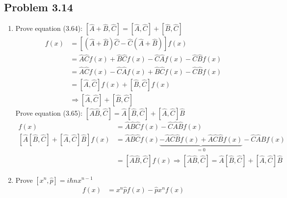 \documentclass{article}
\begin{document}
\subsection*{Problem 3.14}
\begin{enumerate}[label=(\alph*)]
	\item Prove equation (3.64): \([\hat{A} + \hat{B}, \hat{C}] = [\hat{A}, \hat{C}] + [\hat{B}, \hat{C}]\)
	      \begin{align*}
		      [\hat{A} + \hat{B}, \hat{C}] f(x) & = [(\hat{A} + \hat{B}) \hat{C} - \hat{C} (\hat{A} + \hat{B})] f(x)                          \\
		                                        & = \hat{A} \hat{C} f(x) + \hat{B} \hat{C} f(x) - \hat{C} \hat{A} f(x) - \hat{C} \hat{B} f(x) \\
		                                        & = \hat{A} \hat{C} f(x) - \hat{C} \hat{A} f(x) + \hat{B} \hat{C} f(x) - \hat{C} \hat{B} f(x) \\
		                                        & = [\hat{A}, \hat{C}] f(x) + [\hat{B}, \hat{C}] f(x)                                         \\
		                                        & \Rightarrow [\hat{A}, \hat{C}] + [\hat{B}, \hat{C}]
	      \end{align*}
	      Prove equation (3.65): \( [\hat{A} \hat{B}, \hat{C}] = \hat{A} [\hat{B}, \hat{C}] + [\hat{A}, \hat{C}] \hat{B} \)
	      \begin{align*}
		      [\hat{A} \hat{B}, \hat{C}]f(x)                                 & = \hat{A} \hat{B} \hat{C} f(x) - \hat{C} \hat{A} \hat{B} f(x)                                                                                 \\
		      [\hat{A} [\hat{B}, \hat{C}] + [\hat{A}, \hat{C}] \hat{B} ]f(x) & = \hat{A} \hat{B} \hat{C} f(x) \underbrace{- \hat{A} \hat{C} \hat{B} f(x) + \hat{A} \hat{C} \hat{B} f(x)}_{=0} - \hat{C} \hat{A} \hat{B} f(x) \\
		                                                                     & = [\hat{A} \hat{B}, \hat{C}] f(x) \Rightarrow [\hat{A} \hat{B}, \hat{C}] = \hat{A} [\hat{B}, \hat{C}] + [\hat{A}, \hat{C}] \hat{B}
	      \end{align*}
	\item Prove \([x^n, \hat{p}] = i \hbar n x ^{n-1}\)
	      \begin{align*}
		      [x^n, \hat{p}]f(x) & = x^n \hat{p} f(x) - \hat{p} x^n f(x)                                                       \\

\end{align*}
\end{enumerate}
\end{document}
